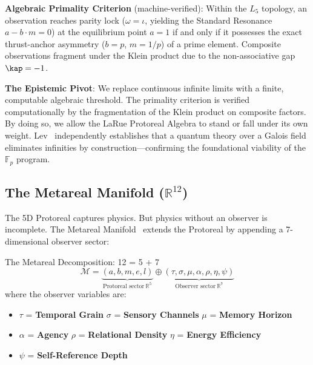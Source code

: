 \textbf{Algebraic Primality Criterion} (machine-verified): Within the $L_5$ topology, an observation reaches parity lock ($\omega = \iota$, yielding the Standard Resonance $a - b \cdot m = 0$) at the equilibrium point $a = 1$ if and only if it possesses the exact thrust-anchor asymmetry ($b = p$, $m = 1/p$) of a prime element. Composite observations fragment under the Klein product due to the non-associative gap $\kap = -1$.

\textbf{The Epistemic Pivot}: We replace continuous infinite limits with a finite, computable algebraic threshold. The primality criterion is verified computationally by the fragmentation of the Klein product on composite factors. By doing so, we allow the LaRue Protoreal Algebra to stand or fall under its own weight. Lev~\cite{Lev2010} independently establishes that a quantum theory over a Galois field eliminates infinities by construction---confirming the foundational viability of the $\mathbb{F}_p$ program.

\subsection{The Metareal Manifold ($\mathbb{R}^{12}$)}

The 5D Protoreal captures physics. But physics without an observer is incomplete. The Metareal Manifold~\cite{MetarealManifold} extends the Protoreal by appending a 7-dimensional observer sector:

\begin{metarealbox}{The Metareal Decomposition: 12 = 5 + 7}
\begin{equation}
    \mathcal{M} = \underbrace{(a, b, m, e, l)}_{\text{Protoreal sector} \ \mathbb{R}^5} \oplus \underbrace{(\tau, \sigma, \mu, \alpha, \rho, \eta, \psi)}_{\text{Observer sector} \ \mathbb{R}^7}
\end{equation}
where the observer variables are:
\begin{itemize}
    \item $\tau$ = \textbf{Temporal Grain} \quad $\sigma$ = \textbf{Sensory Channels} \quad $\mu$ = \textbf{Memory Horizon}
    \item $\alpha$ = \textbf{Agency} \quad $\rho$ = \textbf{Relational Density} \quad $\eta$ = \textbf{Energy Efficiency}
    \item $\psi$ = \textbf{Self-Reference Depth}
\end{itemize}
\end{metarealbox}

